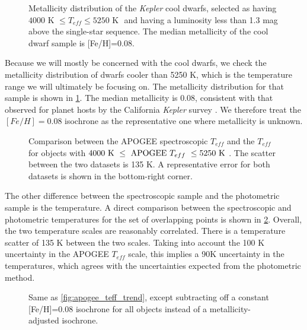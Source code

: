 \documentclass[manuscript]{aastex6}
\newcommand{\Kepler}{\mbox{\textit{Kepler}}}
\newcommand{\Teff}{\ensuremath{T_{eff}}}
\begin{document}
\begin{figure}[htb]
    \centering
    \caption{Metallicity distribution of the \Kepler{} cool dwarfs, selected as
        having \(4000 \textrm{ K } \le \Teff \le 5250 \textrm{ K }\) and having
        a luminosity less than 1.3 mag above the single-star sequence. The 
        median metallicity of the cool dwarf sample is 
    [Fe/H]=0.08.}\label{fig:metallicity}
\end{figure}

Because we will mostly be concerned with the cool dwarfs, we check the
metallicity distribution of dwarfs cooler than 5250 K, which is the temperature
range we will ultimately be focusing on. The metallicity distribution for that
sample is shown in \cref{fig:metallicity}. The median metallicity is 
0.08, consistent with that observed for planet hosts by 
the California \Kepler{} survey \citep{Petigura17}.  We therefore treat the \([Fe/H] =
0.08\) isochrone as the representative one where metallicity is unknown.

\begin{figure}[htb]
    \centering
    \caption{Comparison between the APOGEE spectroscopic \Teff{} and the
        \citet{Pinsonneault12} \Teff{} for objects with \(4000 \textrm{ K } \le
    \textrm{ APOGEE \Teff{} } \le 5250 \textrm{ K }\). The scatter between the
two datasets is 135 K. A representative error for both datasets is shown in the
bottom-right corner.}\label{fig:teffdiff}
\end{figure}

The other difference between the spectroscopic sample and the photometric
sample is the temperature. A direct comparison between the spectroscopic 
and photometric temperatures for the set of overlapping points is shown in 
\cref{fig:teffdiff}. Overall, the two temperature scales are reasonably
correlated. There is a temperature scatter of 135 K between the two scales.
Taking into account the 100 K uncertainty in the APOGEE \Teff{} scale, this
implies a 90K uncertainty in the \citep{Pinsonneault12} temperatures, which
agrees with the uncertainties expected from the photometric method. 

\begin{figure}[htb]
    \centering
    \caption{Same as \cref{fig:apogee_teff_trend}, except subtracting off a
    constant [Fe/H]=0.08 isochrone for all objects instead of a 
    metallicity-adjusted isochrone.}\label{fig:photuncor}
\end{figure}
\end{document}
